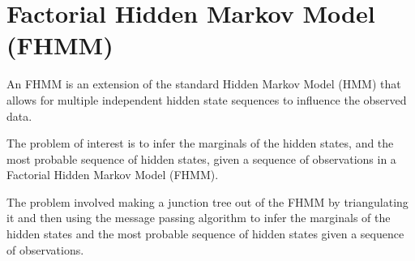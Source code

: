 \section{Factorial Hidden Markov Model (FHMM)}

An FHMM is an extension of the standard Hidden Markov Model (HMM) that allows for multiple independent hidden state sequences to influence the observed data.

The problem of interest is to infer the marginals of the hidden states, and the most probable sequence of hidden states, given a sequence of observations in a Factorial Hidden Markov Model (FHMM).

The problem involved making a junction tree out of the FHMM by triangulating it and then using the message passing algorithm to infer the marginals of the hidden states and the most probable sequence of hidden states given a sequence of observations.

